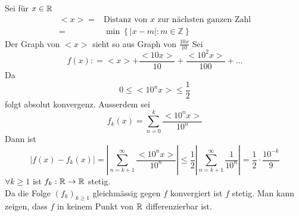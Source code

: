 \noindent Sei für $x\in\mathbb{R}$ 
\begin{align*}
<x> =&\text{Distanz von $x$ zur nächsten ganzen Zahl}\\
=&\min\left\{ \left| x-m\right|:m\in\mathbb{Z}\right\}
\end{align*}
Der Graph von $<x>$ sieht so aus 
Graph von $\frac{10x}{10}$ 
Sei 
\[f\left( x \right): =  < x >  + \frac{{ < 10x > }}{{10}} + \frac{{ < {{10}^2}x > }}{{100}} +  \ldots \]
Da 
\[0 \le  < {10^n}x >  \le \frac{1}{2}\]
folgt absolut konvergenz. Ausserdem sei 
\[{f_k}\left( x \right) = \sum\limits_{n = 0}^k {\frac{{ < {{10}^n}x > }}{{{{10}^n}}}} \]
Dann ist 
\[\left| {f\left( x \right) - {f_k}\left( x \right)} \right| = \left| {\sum\limits_{n = k + 1}^\infty  {\frac{{ < {{10}^n}x > }}{{{{10}^n}}}} } \right| \le \frac{1}{2}\left| {\sum\limits_{n = k + 1}^\infty  {\frac{1}{{{{10}^n}}}} } \right| = \frac{1}{2} \cdot \frac{{{{10}^{ - k}}}}{9}\]
$\forall k\geq 1$ ist $f_k:\mathbb{R}\to\mathbb{R}$ stetig. \\

Da die Folge $\left( f_k\right)_{k\geq 1}$ gleichmässig gegen $f$ konvergiert ist $f$ stetig. Man kann zeigen, dass $f$ in keinem Punkt von $\mathbb{R}$ differenzierbar ist. 
